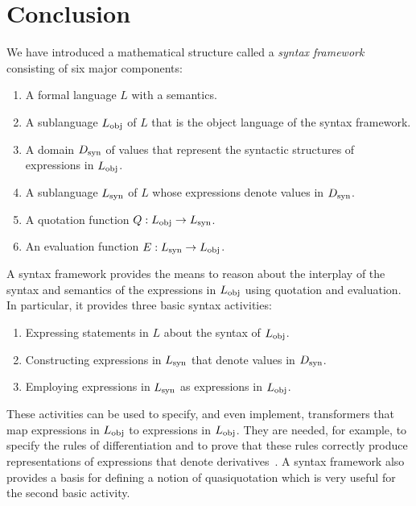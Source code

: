 \documentclass[11pt,fleqn]{article}
\newcommand{\be}{\begin{enumerate}}
\newcommand{\ee}{\end{enumerate}}
\newcommand{\tarrow}{\rightarrow}
\begin{document}
\newpage

\section{Conclusion} \label{sec:conclusion}

We have introduced a mathematical structure called a \emph{syntax
  framework} consisting of six major components:

\be

  \item A formal language $L$ with a semantics.

  \item A sublanguage $L_{\rm obj}$ of $L$ that is the object language
    of the syntax framework.

  \item A domain $D_{\rm syn}$ of values that represent the syntactic
    structures of expressions in $L_{\rm obj}$.

  \item A sublanguage $L_{\rm syn}$ of $L$ whose expressions denote
    values in $D_{\rm syn}$.

  \item A quotation function $Q : L_{\rm obj} \tarrow L_{\rm syn}$.

  \item An evaluation function $E : L_{\rm syn} \tarrow L_{\rm obj}$.

\ee

A syntax framework provides the means to reason about the interplay of
the syntax and semantics of the expressions in $L_{\rm obj}$ using
quotation and evaluation.  In particular, it provides three basic
syntax activities:

\be

  \item Expressing statements in $L$ about the syntax of $L_{\rm
    obj}$.

  \item Constructing expressions in $L_{\rm syn}$ that denote values
    in $D_{\rm syn}$.

  \item Employing expressions in $L_{\rm syn}$ as expressions in
    $L_{\rm obj}$.

\ee
These activities can be used to specify, and even implement,
transformers that map expressions in $L_{\rm obj}$ to expressions in
$L_{\rm obj}$.  They are needed, for example, to specify the rules of
differentiation and to prove that these rules correctly produce
representations of expressions that denote
derivatives~\cite{Farmer13}.  A syntax framework also provides a basis
for defining a notion of quasiquotation which is very useful for the
second basic activity.
\end{document}
